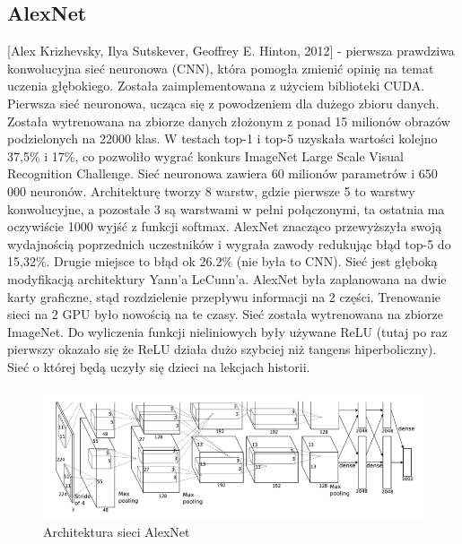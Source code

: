 \documentclass[12pt,a4paper,twoside,titlepage,openright]{book}
\begin{document}
\subsection{AlexNet}
 [Alex Krizhevsky, Ilya Sutskever, Geoffrey E. Hinton, 2012] - pierwsza prawdziwa konwolucyjna sieć neuronowa (CNN), która pomogła zmienić opinię na temat uczenia głębokiego. Została zaimplementowana z użyciem biblioteki CUDA. Pierwsza sieć neuronowa, ucząca się z powodzeniem dla dużego zbioru danych.
 Została wytrenowana na zbiorze danych złożonym z ponad 15 milionów obrazów podzielonych na 22000 klas. 
 W testach top-1 i top-5 uzyskała wartości kolejno 37,5\% i 17\%, co pozwoliło wygrać konkurs ImageNet Large Scale Visual Recognition Challenge. 
 Sieć neuronowa zawiera 60 milionów parametrów i 650 000 neuronów. Architekturę tworzy 8 warstw, gdzie pierwsze 5 to warstwy konwolucyjne, a pozostałe 3 są warstwami w pełni połączonymi, ta ostatnia ma oczywiście 1000 wyjść z funkcji softmax. AlexNet znacząco przewyższyła swoją wydajnością poprzednich uczestników i wygrała zawody redukując błąd top-5 do 15,32\%. Drugie miejsce to błąd ok 26.2\% (nie była to CNN). Sieć jest głęboką modyfikacją architektury Yann’a LeCunn’a. AlexNet była zaplanowana na dwie karty graficzne, stąd rozdzielenie przepływu informacji na 2 części. Trenowanie sieci na 2 GPU było nowością na te czasy. Sieć została wytrenowana na zbiorze ImageNet. Do wyliczenia funkcji nieliniowych były używane ReLU (tutaj po raz pierwszy okazało się że ReLU działa dużo szybciej niż tangens hiperboliczny). Sieć o której będą uczyły się dzieci na lekcjach historii. \cite{NIPS2012_4824}

\begin{figure}[h]
	\centering
			\includegraphics[resolution=100, scale=0.7]{AlexNet.png}
		\caption{Architektura sieci AlexNet}
\end{figure}
\end{document}
